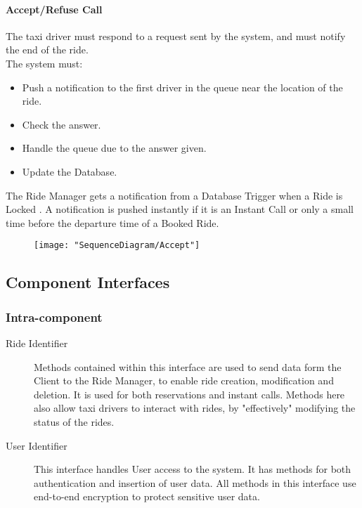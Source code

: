 			\paragraph{Accept/Refuse Call}
				The taxi driver must respond to a request sent by the system, and must notify the end of the ride.\\
				The system must:\begin{itemize}
					\item Push a notification to the first driver in the queue near the location of the ride.
					\item Check the answer.
					\item Handle the queue due to the answer given.
					\item Update the Database.
				\end{itemize}
				The Ride Manager gets a notification from a Database Trigger when a Ride is Locked .
				A notification is pushed instantly if it is an Instant Call or only a small time before the departure time of a Booked Ride.
				\newpage
				\begin{figure}[h!]
					\centering
					\texttt{[image: "SequenceDiagram/Accept"]}
				\end{figure}
				\newpage


\subsection{Component Interfaces}
	\subsubsection{Intra-component}
		\begin{description}
			\item[Ride Identifier]
				Methods contained within this interface are used to send data form the Client to the Ride Manager, to enable ride creation, modification and deletion. It is used for both
				reservations and instant calls. Methods here also allow taxi drivers to interact with rides, by "effectively" modifying the status of the rides.
			\item[User Identifier]
				This interface handles User access to the system. It has methods for both authentication and insertion of user data. All methods in this interface use end-to-end encryption
				to protect sensitive user data.
		\end{description}
